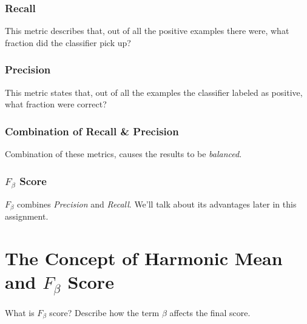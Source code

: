 \documentclass[12pt]{article}
\numberwithin{equation}{section}
\numberwithin{table}{section}
\numberwithin{figure}{section}
\begin{document}
\subsubsection*{Recall}
This metric describes that, out of all the positive examples there were, what fraction did the classifier pick up?

\subsubsection*{Precision}
This metric states that, out of all the examples the classifier labeled as positive, what fraction were correct?

\subsubsection*{Combination of Recall \& Precision}
Combination of these metrics, causes the results to be \textit{balanced}.

\subsubsection*{$F_{\beta}$ Score}
$F_{\beta}$ combines \textit{Precision} and \textit{Recall}. We'll talk about its advantages later in this assignment.
\newpage

\section{The Concept of Harmonic Mean and $F_{\beta}$ Score}
What is $F_{\beta}$ score? Describe how the term $\beta$ affects the final score.
\end{document}
